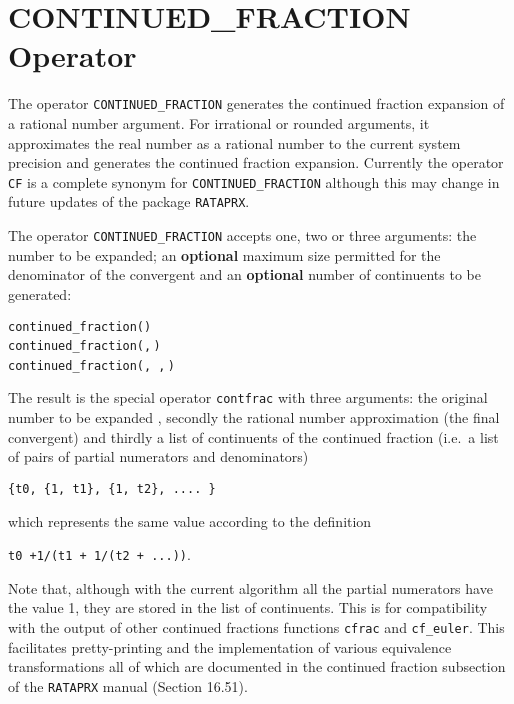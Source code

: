 \section{CONTINUED\_FRACTION Operator}
\hypertarget{operator:CONTINUED_FRACTION}{}

The operator \texttt{CONTINUED\_FRACTION}
generates the continued fraction expansion of a rational number argument.
For irrational or rounded arguments, it approximates the real number
as a rational number to the current system precision and generates
the continued fraction expansion. Currently the operator \texttt{CF} is a
complete synonym for \texttt{CONTINUED\_FRACTION} although this may change
in future updates of the package \texttt{RATAPRX}.

The operator \texttt{CONTINUED\_FRACTION} accepts one, two or
three arguments: the number to be expanded; an \textbf{optional} maximum size
permitted for the denominator of the convergent
and an \textbf{optional} number of continuents to be generated:
\begin{syntaxtable}
  \texttt{continued\_fraction(}\texttt{)}\\
  \texttt{continued\_fraction(}\texttt{,}\,\texttt{)}\\
  \texttt{continued\_fraction(}\texttt{,}\,%
  \texttt{,}\,\texttt{)}
\end{syntaxtable}
The result is the special operator \texttt{contfrac}
with three arguments: the original number to be expanded
, secondly the rational number approximation (the final convergent)
and thirdly a list of continuents of the continued fraction (i.e.\ a list of
pairs of partial numerators and denominators)

\hspace{10mm}\texttt{\{t0, \{1, t1\}, \{1, t2\}, .... \}}

which represents the same value according to the definition

\hspace{10mm}\texttt{t0 +1/(t1 + 1/(t2 + ...))}.

Note that, although with the current
algorithm all the partial numerators have the value 1, they are stored
in the list of continuents. This is for compatibility with the output of
other continued fractions functions \texttt{cfrac} and \texttt{cf\_euler}.
This facilitates pretty-printing and the implementation of various equivalence
transformations all of which are documented in the continued fraction
subsection of the \texttt{RATAPRX} manual (Section 16.51).

